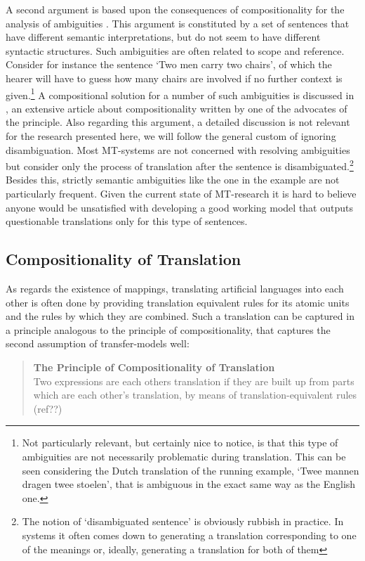 \documentclass{report}
\theoremstyle{definition}
\theoremstyle{plain}
\begin{document}
A second argument is based upon the consequences of compositionality for the analysis of ambiguities \cite{pelletier1994principle}. This argument is constituted by a set of sentences that have different semantic interpretations, but do not seem to have different syntactic structures. Such ambiguities are often related to scope and reference. Consider for instance the sentence `Two men carry two chairs', of which the hearer will have to guess how many chairs are involved if no further context is given.\footnote{Not particularly relevant, but certainly nice to notice, is that this type of ambiguities are not necessarily problematic during translation. This can be seen considering the Dutch translation of the running example, `Twee mannen dragen twee stoelen', that is ambiguous in the exact same way as the English one.} A compositional solution for a number of such ambiguities is discussed in \cite{janssen1996compositionality}, an extensive article about compositionality written by one of the advocates of the principle. Also regarding this argument, a detailed discussion is not relevant for the research presented here, we will follow the general custom of ignoring disambiguation. Most MT-systems are not concerned with resolving ambiguities but consider only the process of translation after the sentence is disambiguated.\footnote{The notion of `disambiguated sentence' is obviously rubbish in practice. In systems it often comes down to generating a translation corresponding to one of the meanings or, ideally, generating a translation for both of them} Besides this, strictly semantic ambiguities like the one in the example are not particularly frequent. Given the current state of MT-research it is hard to believe anyone would be unsatisfied with developing a good working model that outputs questionable translations only for this type of sentences.

\subsection{Compositionality of Translation}

As regards the existence of mappings, translating artificial languages into each other is often done by providing translation equivalent rules for its atomic units and the rules by which they are combined. Such a translation can be captured in a principle analogous to the principle of compositionality, that captures the second assumption of transfer-models well:

\begin{quote}
\textbf{The Principle of Compositionality of Translation}\\
Two expressions are each others translation if they are built up from parts which are each other's translation, by means of translation-equivalent rules (ref??)
\end{quote}
\end{document}
